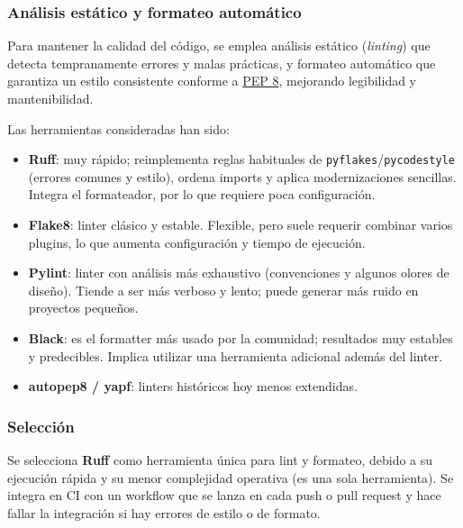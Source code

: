 \subsubsection{Análisis estático y formateo automático}
Para mantener la calidad del código, se emplea análisis estático (\emph{linting}) que detecta tempranamente 
errores y malas prácticas, y formateo automático que garantiza un estilo consistente conforme a 
\href{https://peps.python.org/pep-0008/}{PEP 8}, mejorando legibilidad y mantenibilidad.

Las herramientas consideradas han sido:

\begin{itemize}
  \item \textbf{Ruff}: muy rápido; reimplementa reglas habituales de \texttt{pyflakes}/\texttt{pycodestyle}
  (errores comunes y estilo), ordena imports y aplica modernizaciones sencillas. Integra el formateador, por
  lo que requiere poca configuración.
  \item \textbf{Flake8}: linter clásico y estable. Flexible, pero suele requerir combinar
  varios plugins, lo que aumenta configuración y tiempo de ejecución.
  \item \textbf{Pylint}: linter con análisis más exhaustivo (convenciones y algunos olores de diseño). Tiende
  a ser más verboso y lento; puede generar más ruido en proyectos pequeños.
  \item \textbf{Black}: es el formatter más usado por la comunidad; resultados muy estables y predecibles. Implica
  utilizar una herramienta adicional además del linter.
  \item \textbf{autopep8 / yapf}: linters históricos hoy menos extendidas.
\end{itemize}

\subsubsection{Selección}
Se selecciona \textbf{Ruff} como herramienta única para lint y formateo, debido a su ejecución rápida y su menor 
complejidad operativa (es una sola herramienta).
Se integra en CI con un workflow que se lanza en cada push o pull request y hace fallar la integración si hay 
errores de estilo o de formato.